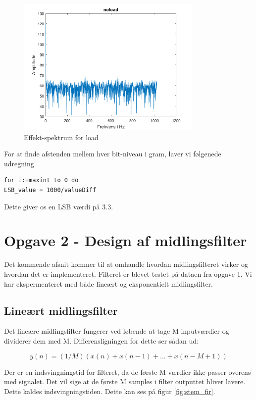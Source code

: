 \documentclass[12pt]{article}
\begin{document}
\begin{figure}[H]
	\centering
	\includegraphics[width=90mm]{Img/noload_effekt.png}
	\caption{Effekt-spektrum for load}
	\label{fig:effekt_load}
\end{figure}

For at finde afstenden mellem hver bit-niveau i gram, laver vi følgenede udregning.

\begin{lstlisting}[frame=single]  % Start your code-block
for i:=maxint to 0 do
LSB_value = 1000/valueDiff
\end{lstlisting}

Dette giver os en LSB værdi på 3.3.

\section{Opgave 2 - Design af midlingsfilter}
Det kommende afsnit kommer til at omhandle hvordan midlingsfilteret virker og hvordan det er implementeret. Filteret er blevet testet på dataen fra opgave 1. Vi har ekspermenteret med både lineært og eksponentielt midlingsfilter. 

\subsection{Lineært midlingsfilter}
Det lineære midlingsfilter fungerer ved løbende at tage M inputværdier og dividerer dem med M. Differensligningen for dette ser sådan ud:

\[ y(n)= (1/M)(x(n)+x(n-1)+...+x(n-M+1))\]

Der er en indsvingningstid for filteret, da de første M værdier ikke passer overens med signalet. Det vil sige at de første M samples i filter outputtet bliver lavere. Dette kaldes indsvingningstiden. Dette kan ses på figur \ref{fig:stem_fir}.
\end{document}
